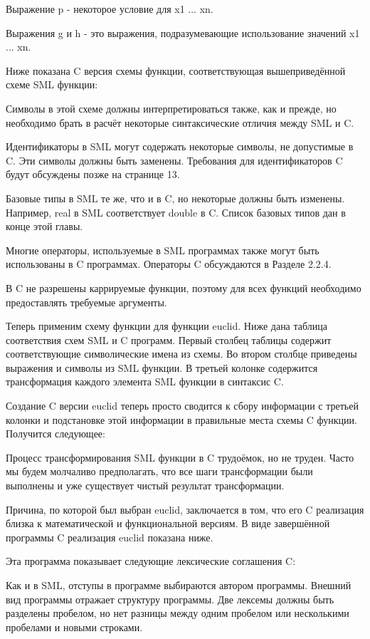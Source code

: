 Выражение p - некоторое условие для x1 ... xn.

Выражения g и h - это выражения, подразумевающие использование значений x1 ... xn.

Ниже показана C версия схемы функции, соответствующая вышеприведённой схеме SML функции:

Символы в этой схеме должны интерпретироваться также, как и прежде, но необходимо брать в расчёт некоторые синтаксические отличия между SML и C.

Идентификаторы в SML могут содержать некоторые символы, не допустимые в C. Эти символы должны быть заменены. Требования для идентификаторов C будут обсуждены позже на странице 13.

Базовые типы в SML те же, что и в C, но некоторые должны быть изменены. Например, real в SML соответствует double в C. Список базовых типов дан в конце этой главы.

Многие операторы, используемые в SML программах также могут быть использованы в C программах. Операторы C обсуждаются в Разделе 2.2.4.

В C не разрешены каррируемые функции, поэтому для всех функций необходимо предоставлять требуемые аргументы.

Теперь применим схему функции для функции euclid. Ниже дана таблица соответствия схем SML и C программ. Первый столбец таблицы содержит соответствующие символические имена из схемы. Во втором столбце приведены выражения и символы из SML функции. В третьей колонке содержится трансформация каждого элемента SML функции в синтаксис C.

Создание C версии euclid теперь просто сводится к сбору информации с третьей колонки и подстановке этой информации в правильные места схемы C функции. Получится следующее:

Процесс трансформирования SML функции в C трудоёмок, но не труден. Часто мы будем молчаливо предполагать, что все шаги трансформации были выполнены и уже существует чистый результат трансформации.

Причина, по которой был выбран euclid, заключается в том, что его C реализация близка к математической и функциональной версиям. В виде завершённой программы C реализация euclid показана ниже.

Эта программа показывает следующие лексические соглашения C:

Как и в SML, отступы в программе выбираются автором программы. Внешний вид программы отражает структуру программы. Две лексемы должны быть разделены пробелом, но нет разницы между одним пробелом или несколькими пробелами и новыми строками.

